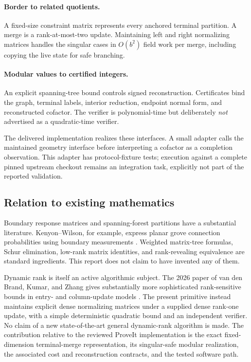 \documentclass[11pt,letterpaper]{article}
\theoremstyle{definition}\newtheorem{definition}[theorem]{Definition}
\theoremstyle{remark}\newtheorem{remark}[theorem]{Remark}
\begin{document}
\paragraph{Border to related quotients.}
A fixed-size constraint matrix represents every anchored terminal partition. A merge is a rank-at-most-two update. Maintaining left and right normalizing matrices handles the singular cases in $O(b^2)$ field work per merge, including copying the live state for safe branching.

\paragraph{Modular values to certified integers.}
An explicit spanning-tree bound controls signed reconstruction. Certificates bind the graph, terminal labels, interior reduction, endpoint normal form, and reconstructed cofactor. The verifier is polynomial-time but deliberately \emph{not} advertised as a quadratic-time verifier.

The delivered implementation realizes these interfaces. A small adapter calls the maintained geometry interface before interpreting a cofactor as a completion observation. This adapter has protocol-fixture tests; execution against a complete pinned upstream checkout remains an integration task, explicitly not part of the reported validation.

\subsection{Relation to existing mathematics}
Boundary response matrices and spanning-forest partitions have a substantial literature. Kenyon--Wilson, for example, express planar grove connection probabilities using boundary measurements \cite{kenyonwilson}. Weighted matrix-tree formulas, Schur elimination, low-rank matrix identities, and rank-revealing equivalence are standard ingredients. This report does not claim to have invented any of them.

Dynamic rank is itself an active algorithmic subject. The 2026 paper of van den Brand, Kumar, and Zhang gives substantially more sophisticated rank-sensitive bounds in entry- and column-update models \cite{dynamicrank}. The present primitive instead maintains explicit dense normalizing matrices under a supplied dense rank-one update, with a simple deterministic quadratic bound and an independent verifier. No claim of a new state-of-the-art general dynamic-rank algorithm is made. The contribution relative to the reviewed ProveIt implementation is the exact fixed-dimension terminal-merge representation, its singular-safe modular realization, the associated cost and reconstruction contracts, and the tested software path.
\end{document}
